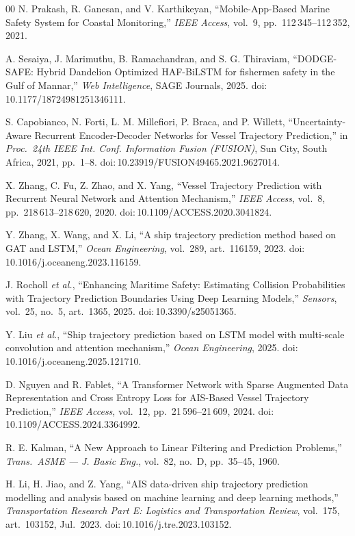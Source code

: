 \documentclass[conference]{IEEEtran}
\begin{document}
\begin{thebibliography}{00}
 N. Prakash, R. Ganesan, and V. Karthikeyan, ``Mobile-App-Based Marine Safety System for Coastal Monitoring,'' \emph{IEEE Access}, vol.~9, pp.~112\,345--112\,352, 2021.

 A. Sesaiya, J. Marimuthu, B. Ramachandran, and S. G. Thiraviam, ``DODGE-SAFE: Hybrid Dandelion Optimized HAF-BiLSTM for fishermen safety in the Gulf of Mannar,'' \emph{Web Intelligence}, SAGE Journals, 2025. doi:\,10.1177/18724981251346111.

 S. Capobianco, N. Forti, L. M. Millefiori, P. Braca, and P. Willett, ``Uncertainty-Aware Recurrent Encoder-Decoder Networks for Vessel Trajectory Prediction,'' in \emph{Proc.\ 24th IEEE Int. Conf. Information Fusion (FUSION)}, Sun City, South Africa, 2021, pp.~1--8. doi:\,10.23919/FUSION49465.2021.9627014.

 X. Zhang, C. Fu, Z. Zhao, and X. Yang, ``Vessel Trajectory Prediction with Recurrent Neural Network and Attention Mechanism,'' \emph{IEEE Access}, vol.~8, pp.~218\,613--218\,620, 2020. doi:\,10.1109/ACCESS.2020.3041824.

 Y. Zhang, X. Wang, and X. Li, ``A ship trajectory prediction method based on GAT and LSTM,'' \emph{Ocean Engineering}, vol.~289, art.\ 116159, 2023. doi:\,10.1016/j.oceaneng.2023.116159.

 J. Rocholl \emph{et al.}, ``Enhancing Maritime Safety: Estimating Collision Probabilities with Trajectory Prediction Boundaries Using Deep Learning Models,'' \emph{Sensors}, vol.~25, no.~5, art.\ 1365, 2025. doi:\,10.3390/s25051365.

 Y. Liu \emph{et al.}, ``Ship trajectory prediction based on LSTM model with multi-scale convolution and attention mechanism,'' \emph{Ocean Engineering}, 2025. doi:\,10.1016/j.oceaneng.2025.121710.

 D. Nguyen and R. Fablet, ``A Transformer Network with Sparse Augmented Data Representation and Cross Entropy Loss for AIS-Based Vessel Trajectory Prediction,'' \emph{IEEE Access}, vol.~12, pp.~21\,596--21\,609, 2024. doi:\,10.1109/ACCESS.2024.3364992.

 R. E. Kalman, ``A New Approach to Linear Filtering and Prediction Problems,'' \emph{Trans.\ ASME --- J. Basic Eng.}, vol.~82, no.~D, pp.~35--45, 1960.

 H. Li, H. Jiao, and Z. Yang, ``AIS data-driven ship trajectory prediction modelling and analysis based on machine learning and deep learning methods,'' \emph{Transportation Research Part E: Logistics and Transportation Review}, vol.~175, art.\ 103152, Jul.\ 2023. doi:\,10.1016/j.tre.2023.103152.


\end{thebibliography}
\end{document}
